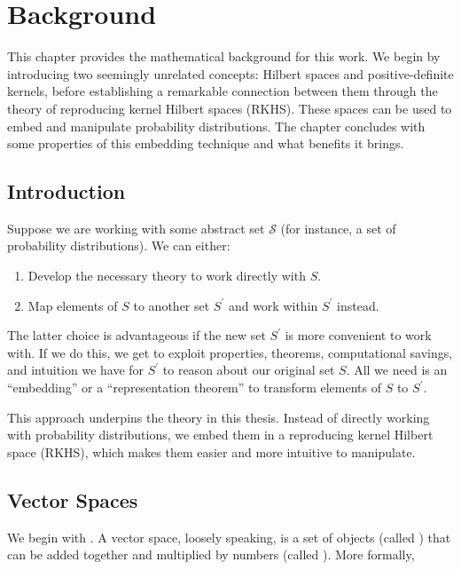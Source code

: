 \chapter{Background}

This chapter provides the mathematical background for this work.  We begin by introducing two seemingly unrelated concepts: Hilbert spaces and positive-definite kernels, before establishing a remarkable connection between them through the theory of reproducing kernel Hilbert spaces (RKHS). These spaces can be used to embed and manipulate probability distributions. The chapter concludes with some properties of this embedding technique and what benefits it brings.

\section{Introduction}
Suppose we are working with some abstract set $\mathcal{S}$ (for instance, a set of probability distributions). We can either:

\begin{enumerate}
  \item Develop the necessary theory to work directly with $S$.
  \item Map elements of $S$ to another set $S^\prime$ and work within $S^\prime$ instead.
\end{enumerate}

The latter choice is advantageous if the new set $S^\prime$ is more convenient to work with. If we do this, we get to exploit properties, theorems, computational savings, and intuition we have for $S^\prime$ to reason about our original set $S$. All we need is an ``embedding'' or a ``representation theorem'' to transform elements of $S$ to $S^\prime$.

This approach underpins the theory in this thesis. Instead of directly working with probability distributions, we embed them in a reproducing kernel Hilbert space (RKHS), which makes them easier and more intuitive to manipulate.



\section{Vector Spaces}
We begin with . A vector space, loosely speaking, is a set of objects (called ) that can be added together and multiplied by numbers (called ). More formally,

